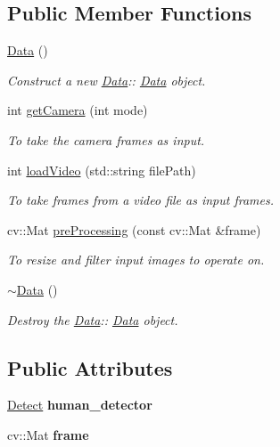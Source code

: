 \subsection*{Public Member Functions}
\begin{DoxyCompactItemize}
\item 
\mbox{\label{classData_af11f741cb7f587e2e495452a8905a22a}} 
\hyperlink{classData_af11f741cb7f587e2e495452a8905a22a}{Data} ()
\begin{DoxyCompactList}\small\item\em Construct a new \hyperlink{classData}{Data}\+:\+: \hyperlink{classData}{Data} object. \end{DoxyCompactList}\item 
int \hyperlink{classData_a511184f11597e720b0bf96b9b4f89a0b}{get\+Camera} (int mode)
\begin{DoxyCompactList}\small\item\em To take the camera frames as input. \end{DoxyCompactList}\item 
int \hyperlink{classData_ae02b7e6ada4f27a9edccc577e42bba99}{load\+Video} (std\+::string file\+Path)
\begin{DoxyCompactList}\small\item\em To take frames from a video file as input frames. \end{DoxyCompactList}\item 
cv\+::\+Mat \hyperlink{classData_a8791dd62b1f57b4e4f2039e934ec7fdf}{pre\+Processing} (const cv\+::\+Mat \&frame)
\begin{DoxyCompactList}\small\item\em To resize and filter input images to operate on. \end{DoxyCompactList}\item 
\mbox{\label{classData_aab31956423290f0d62dcca47ab4d16dd}} 
\hyperlink{classData_aab31956423290f0d62dcca47ab4d16dd}{$\sim$\+Data} ()
\begin{DoxyCompactList}\small\item\em Destroy the \hyperlink{classData}{Data}\+:\+: \hyperlink{classData}{Data} object. \end{DoxyCompactList}\end{DoxyCompactItemize}
\subsection*{Public Attributes}
\begin{DoxyCompactItemize}
\item 
\mbox{\label{classData_aa4b6fa81e2c1055e4a193bef4fd1b03c}} 
\hyperlink{classDetect}{Detect} {\bfseries human\+\_\+detector}
\item 
\mbox{\label{classData_aba335c8ce9ac25fe621238c4c5d9acdb}} 
cv\+::\+Mat {\bfseries frame}
\end{DoxyCompactItemize}


